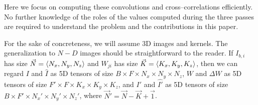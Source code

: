   Here we focus on computing these convolutions and
  cross--correlations efficiently.  No further knowledge of the roles
  of the values computed during the three passes are required to
  understand the problem and the contributions in this paper.



  For the sake of concreteness, we will assume 3D images and
  kernels. The generalization to $N-D$ images should be
  straightforward to the reader.
  If $I_{b,i}$ has size $\vec{N} = \langle N_x, N_y, N_z\rangle$ and
  $W_{ji}$ has size $\vec{K} = \langle K_x,K_y,K_z\rangle$, then we can
  regard $I$ and $\hat{I}$ as 5D tensors of size $B \times F \times N_x
  \times N_y \times N_z$, $W$ and $\Delta W$ as 5D tensors of size $F'
  \times F \times K_x \times K_y \times K_z$, and $I'$ and $\hat{I'}$ as
  5D tensors of size $B \times F' \times N_x' \times N_y' \times N_z'$,
  where $\vec{N}' = \vec{N} - \vec{K} + \vec{1}$.
